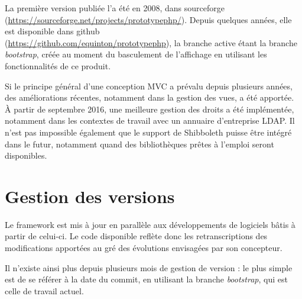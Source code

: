 La première version publiée l'a été en 2008, dans sourceforge \\ (\url{https://sourceforge.net/projects/prototypephp/}). Depuis quelques années, elle est disponible dans github \\(\url{https://github.com/equinton/prototypephp}), la branche active étant la branche \textit{bootstrap}, créée au moment du basculement de l'affichage en utilisant les fonctionnalités de ce produit.

Si le principe général d'une conception MVC a prévalu depuis plusieurs années, des améliorations récentes, notamment dans la gestion des vues, a été apportée. À partir de septembre 2016, une meilleure gestion des droits a été implémentée, notamment dans les contextes de travail avec un annuaire d'entreprise LDAP. 
Il n'est pas impossible également que le support de Shibboleth puisse être intégré dans le futur, notamment quand des bibliothèques prêtes à l'emploi seront disponibles.

\section{Gestion des versions}

Le framework est mis à jour en parallèle aux développements de logiciels bâtis à partir de celui-ci. Le code disponible reflète donc les retranscriptions des modifications apportées au gré des évolutions envisagées par son concepteur.

Il n'existe ainsi plus depuis plusieurs mois de gestion de version : le plus simple est de se référer à la date du commit, en utilisant la branche \textit{bootstrap}, qui est celle de travail actuel.

